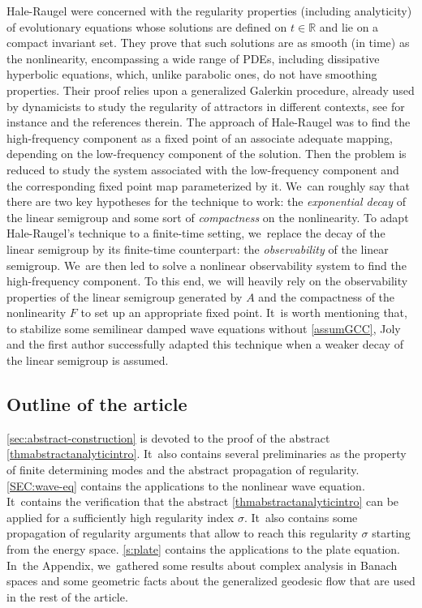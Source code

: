 \documentclass[JEP,XML,SOM,Unicode,published]{cedram}
\theoremstyle{definition}
\newcommand{\R}{\mathbb{R}}
\begin{document}
Hale-Raugel were concerned with the regularity properties (including analyticity) of evolutionary equations whose solutions are defined on $t\in\R$ and lie on a compact invariant set. They prove that such solutions are as smooth (in time) as the nonlinearity, encompassing a wide range of PDEs, including dissipative hyperbolic equations, which, unlike parabolic ones, do not have smoothing properties. Their proof relies upon a generalized Galerkin procedure, already used by dynamicists to study the regularity of attractors in different contexts, see for instance \cite{FT:89,Go:00-torus,Go:18} and the references therein. The approach of Hale-Raugel was to find the high-frequency component as a fixed point of an associate adequate mapping, depending on the low-frequency component of the solution. Then the problem is reduced to study the system associated with the low-frequency component and the corresponding fixed point map parameterized by it. We~can roughly say that there are two key hypotheses for the technique to work: the \emph{exponential decay} of the linear semigroup and some sort of \emph{compactness} on the nonlinearity. To adapt Hale-Raugel's technique to a finite-time setting, we~replace the decay of the linear semigroup by its finite-time counterpart: the \emph{observability} of the linear semigroup. We~are then led to solve a nonlinear observability system to find the high-frequency component. To this end, we~will heavily rely on the observability properties of the linear semigroup generated by $A$ and the compactness of the nonlinearity $F$ to set up an appropriate fixed point. It~is worth mentioning that, to stabilize some semilinear damped wave equations without \ref{assumGCC}, Joly and the first author \cite{2020:joly-laurent:decay-nlw-no-gcc} successfully adapted this technique when a weaker decay of the linear semigroup is assumed.

\subsection{Outline of the article}\cref{sec:abstract-construction} is devoted to the proof of the abstract \cref{thmabstractanalyticintro}. It~also contains several preliminaries as the property of finite determining modes and the abstract propagation of regularity. \cref{SEC:wave-eq} contains the applications to the nonlinear wave equation. It~contains the verification that the abstract \cref{thmabstractanalyticintro} can be applied for a sufficiently high regularity index $\sigma$. It~also contains some propagation of regularity arguments that allow to reach this regularity $\sigma$ starting from the energy space. \cref{s:plate} contains the applications to the plate equation. In~the Appendix, we~gathered some results about complex analysis in Banach spaces and some geometric facts about the generalized geodesic flow that are used in the rest of the article.
\end{document}
